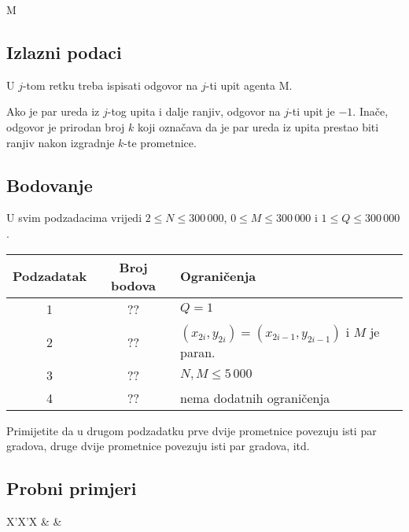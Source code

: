 \begin{statement}[
  problempoints=100,
  timelimit=1 sekunda,
  memorylimit=512 MiB,
]{M}
\subsection*{Izlazni podaci}
U $j$-tom retku treba ispisati odgovor na $j$-ti upit agenta M.

Ako je par ureda iz $j$-tog upita i dalje ranjiv, odgovor na $j$-ti upit je $-1$.
Inače, odgovor je prirodan broj $k$ koji označava da je par ureda iz upita
prestao biti ranjiv nakon izgradnje $k$-te prometnice.


\subsection*{Bodovanje}

U svim podzadacima vrijedi $2 \le N \le 300\,000$, $0 \le M \le 300\,000$ i $1
  \le Q \le 300\,000$.

{\renewcommand{\arraystretch}{1.4}
  \setlength{\tabcolsep}{6pt}
  \begin{tabular}{ccl}
 Podzadatak & Broj bodova & Ograničenja \\ \midrule
  1 & ?? & $Q = 1$ \\
  2 & ?? & $(x_{2i}, y_{2i}) = (x_{2i-1}, y_{2i-1})$ i $M$ je paran. \\
  3 & ?? & $N, M \le 5\,000$ \\
  4 & ?? & nema dodatnih ograničenja
\end{tabular}}

Primijetite da u drugom podzadatku prve dvije prometnice povezuju isti par gradova,
druge dvije prometnice povezuju isti par gradova, itd.

\clearpage


\subsection*{Probni primjeri}
\begin{tabularx}{\textwidth}{X'X'X}
 &
 &
\end{tabularx}

\end{statement}

